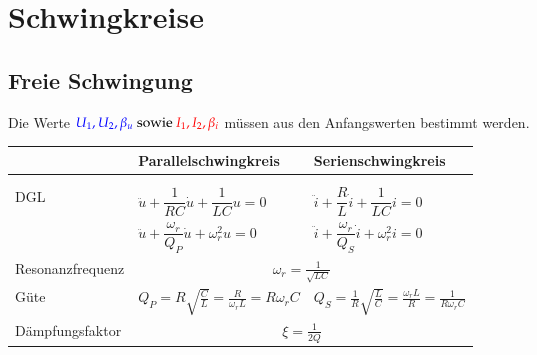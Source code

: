 \section{Schwingkreise}
\subsection{Freie Schwingung}
Die Werte $\textcolor{blue}{U_1,U_2,\beta_u}\text{ sowie
}\textcolor{red}{I_1,I_2,\beta_i}$ müssen aus den Anfangswerten bestimmt
werden.\\
\renewcommand{\arraystretch}{2.5}
\begin{tabular}{| p{4cm} | p{7cm} | p{7cm} |}
	\hline
		& \textbf{Parallelschwingkreis} 
		& \textbf{Serienschwingkreis} \\
	\hline
	& & \\
	& 
	& \\
	\hline	
	DGL &
  $\ddot{u} + \dfrac{1}{RC} \dot{u} + \dfrac{1}{LC} u = 0$
  & $\ddot{i} + \dfrac{R}{L} \dot{i} + \dfrac{1}{LC} i = 0$\\
  & $\ddot{u} + \dfrac{\omega_r}{Q_P} \dot{u} + \omega_r^2 u = 0$
  & $\ddot{i} + \dfrac{\omega_r}{Q_S} \dot{i} + \omega_r^2 i = 0$\\
	\hline
	Resonanzfrequenz & \multicolumn{2}{|c|}{$\omega_r =
	\frac{1}{\sqrt{LC}}$} \\
	\hline
	Güte & 
	$Q_P = R\sqrt{\frac{C}{L}} = \frac{R}{\omega_r L}=R\omega_rC$ &
	$Q_S = \frac{1}{R}\sqrt{\frac{L}{C}} = \frac{\omega_r
	L}{R}=\frac{1}{R\omega_rC}$\\
	\hline
	Dämpfungsfaktor & \multicolumn{2}{|c|}{$\xi=\frac{1}{2Q}$} \\
	\hline
	

\end{tabular}
